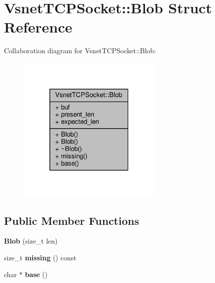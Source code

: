 \hypertarget{structVsnetTCPSocket_1_1Blob}{}\section{Vsnet\+T\+C\+P\+Socket\+:\+:Blob Struct Reference}
\label{structVsnetTCPSocket_1_1Blob}


Collaboration diagram for Vsnet\+T\+C\+P\+Socket\+:\+:Blob\+:
\nopagebreak
\begin{figure}[H]
\begin{center}
\leavevmode
\includegraphics[width=199pt]{d0/d16/structVsnetTCPSocket_1_1Blob__coll__graph}
\end{center}
\end{figure}
\subsection*{Public Member Functions}
\begin{DoxyCompactItemize}
\item 
{\bfseries Blob} (size\+\_\+t len)\hypertarget{structVsnetTCPSocket_1_1Blob_ac38077a824b8a804377408f6a2d3422a}{}\label{structVsnetTCPSocket_1_1Blob_ac38077a824b8a804377408f6a2d3422a}

\item 
size\+\_\+t {\bfseries missing} () const \hypertarget{structVsnetTCPSocket_1_1Blob_ac5a795d112c34e6a2316bcdec80de8e1}{}\label{structVsnetTCPSocket_1_1Blob_ac5a795d112c34e6a2316bcdec80de8e1}

\item 
char $\ast$ {\bfseries base} ()\hypertarget{structVsnetTCPSocket_1_1Blob_ad9ce83b1dca67666fa2eea3ec1015f52}{}\label{structVsnetTCPSocket_1_1Blob_ad9ce83b1dca67666fa2eea3ec1015f52}

\end{DoxyCompactItemize}
